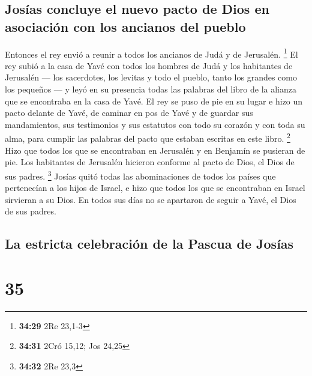\hypertarget{josuxedas-concluye-el-nuevo-pacto-de-dios-en-asociaciuxf3n-con-los-ancianos-del-pueblo}{%
\subsection{Josías concluye el nuevo pacto de Dios en asociación con los
ancianos del
pueblo}\label{josuxedas-concluye-el-nuevo-pacto-de-dios-en-asociaciuxf3n-con-los-ancianos-del-pueblo}}

 Entonces el rey envió a reunir a todos los ancianos de
Judá y de Jerusalén. \footnote{\textbf{34:29} 2Re 23,1-3}
 El rey subió a la casa de Yavé con todos los hombres de
Judá y los habitantes de Jerusalén --- los sacerdotes, los levitas y
todo el pueblo, tanto los grandes como los pequeños --- y leyó en su
presencia todas las palabras del libro de la alianza que se encontraba
en la casa de Yavé.  El rey se puso de pie en su lugar e
hizo un pacto delante de Yavé, de caminar en pos de Yavé y de guardar
sus mandamientos, sus testimonios y sus estatutos con todo su corazón y
con toda su alma, para cumplir las palabras del pacto que estaban
escritas en este libro. \footnote{\textbf{34:31} 2Cró 15,12; Jos 24,25}
 Hizo que todos los que se encontraban en Jerusalén y en
Benjamín se pusieran de pie. Los habitantes de Jerusalén hicieron
conforme al pacto de Dios, el Dios de sus padres. \footnote{\textbf{34:32}
  2Re 23,3}  Josías quitó todas las abominaciones de
todos los países que pertenecían a los hijos de Israel, e hizo que todos
los que se encontraban en Israel sirvieran a su Dios. En todos sus días
no se apartaron de seguir a Yavé, el Dios de sus padres.

\hypertarget{la-estricta-celebraciuxf3n-de-la-pascua-de-josuxedas}{%
\subsection{La estricta celebración de la Pascua de
Josías}\label{la-estricta-celebraciuxf3n-de-la-pascua-de-josuxedas}}

\hypertarget{section-34}{%
\section{35}\label{section-34}}

